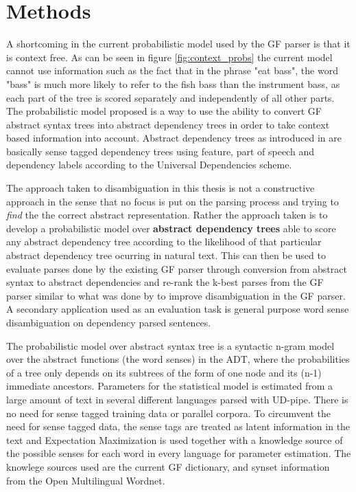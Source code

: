 \chapter{Methods}
\label{chapter:method}

A shortcoming in the current probabilistic model used by the GF parser is that it is context free. As can be seen in figure \ref{fig:context_probs} the current model cannot use information such as the fact that in the phrase "eat bass", the word "bass" is much more likely to refer to the fish bass than the instrument bass, as each part of the tree is scored separately and independently of all other parts. The probabilistic model proposed is a way to use the ability to convert GF abstract syntax trees into abstract dependency trees in order to take context based information into account. Abstract dependency trees as introduced in \citep{kolachina2017ud2gf} are basically sense tagged dependency trees using feature, part of speech and dependency labels according to the Universal Dependencies scheme. 

The approach taken to disambiguation in this thesis is not a constructive approach in the sense that no focus is put on the parsing process and trying to \emph{find} the the correct abstract representation. Rather the approach taken is to develop a probabilistic model over \textbf{abstract dependency trees} able to score any abstract dependency tree according to the likelihood of that particular abstract dependency tree ocurring in natural text. This can then be used to evaluate parses done by the existing GF parser through conversion from abstract syntax to abstract dependencies and re-rank the k-best parses from the GF parser similar to what was done by \citet{kolachina2015GF} to improve disambiguation in the GF parser. A secondary application used as an evaluation task is general purpose word sense disambiguation on dependency parsed sentences.

The probabilistic model over abstract syntax tree is a syntactic n-gram model over the abstract functions (the word senses) in the ADT, where the probabilities of a tree only depends on its subtrees of the form of one node and its (n-1) immediate ancestors. Parameters for the statistical model is estimated from a large amount of text in several different languages parsed with UD-pipe. There is no need for sense tagged training data or parallel corpora. To circumvent the need for sense tagged data, the sense tags are treated as latent information in the text and Expectation Maximization is used together with a knowledge source of the possible senses for each word in every language for parameter estimation. The knowlege sources used are the current GF dictionary, and synset information from the Open Multilingual Wordnet.

